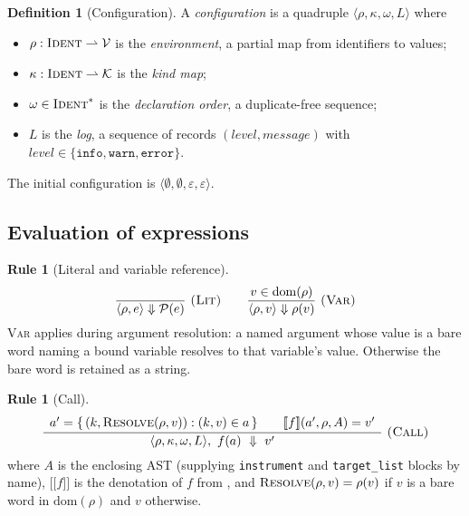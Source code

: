 \documentclass[11pt,twocolumn,a4paper]{article}
\theoremstyle{ssthm}
\theoremstyle{definition}
\newtheorem{definition}[theorem]{Definition}
\newtheorem{rulename}[theorem]{Rule}
\theoremstyle{remark}
\newcommand{\shk}[1]{\texttt{#1}}
\newcommand{\evalto}{\Downarrow}
\newcommand{\Env}{\rho}
\newcommand{\Kinds}{\kappa}
\newcommand{\Ord}{\omega}
\newcommand{\Vals}{\mathcal{V}}
\newcommand{\Kset}{\mathcal{K}}
\providecommand{\llbracket}{\ensuremath{[\![}}
\providecommand{\rrbracket}{\ensuremath{]\!]}}
\begin{document}
\begin{definition}[Configuration]
\label{def:config}
A \emph{configuration} is a quadruple
$\langle \Env, \Kinds, \Ord, L\rangle$ where
\begin{itemize}[leftmargin=1.6em,itemsep=1pt]
\item $\Env:\textsc{Ident}\rightharpoonup\Vals$ is the \emph{environment},
      a partial map from identifiers to values;
\item $\Kinds:\textsc{Ident}\rightharpoonup\Kset$ is the \emph{kind map};
\item $\Ord\in\textsc{Ident}^{*}$ is the \emph{declaration order}, a
      duplicate-free sequence;
\item $L$ is the \emph{log}, a sequence of records
      $(\mathit{level},\mathit{message})$ with
      $\mathit{level}\in\{\shk{info},\shk{warn},\shk{error}\}$.
\end{itemize}
The initial configuration is
$\langle\emptyset,\emptyset,\varepsilon,\varepsilon\rangle$.
\end{definition}

\subsection{Evaluation of expressions}

\begin{rulename}[Literal and variable reference]
\label{rule:lit}
\[
\frac{}{\langle\Env,e\rangle\evalto \mathcal{P}(e)}\ \textsc{(Lit)}
\qquad
\frac{v\in\mathrm{dom}(\Env)}{\langle\Env,v\rangle\evalto \Env(v)}\ \textsc{(Var)}
\]
\textsc{Var} applies during argument resolution: a named argument whose
value is a bare word naming a bound variable resolves to that variable's
value. Otherwise the bare word is retained as a string.
\end{rulename}

\begin{rulename}[Call]
\label{rule:call}
\[
\frac{\begin{array}{c}
a'=\{\,(k,\textsc{Resolve}(\Env,v)) : (k,v)\in a\,\}\qquad
\llbracket f\rrbracket(a',\Env,A)=v'
\end{array}}
{\langle\Env,\Kinds,\Ord,L\rangle,\ f(a)\ \evalto\ v'}
\ \textsc{(Call)}
\]
where $A$ is the enclosing AST (supplying \shk{instrument} and
\shk{target\_list} blocks by name), $\llbracket f\rrbracket$ is the
denotation of $f$ from , and
$\textsc{Resolve}(\Env,v)=\Env(v)$ if $v$ is a bare word in
$\mathrm{dom}(\Env)$ and $v$ otherwise.
\end{rulename}
\end{document}
